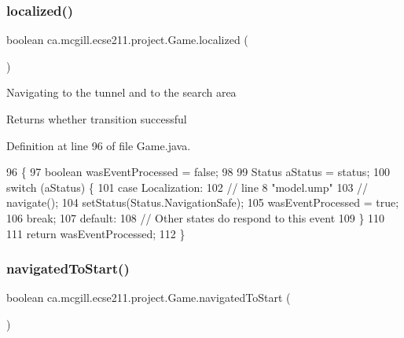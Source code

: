 \subsubsection{\texorpdfstring{localized()}{localized()}}
{\footnotesize\ttfamily boolean ca.\+mcgill.\+ecse211.\+project.\+Game.\+localized (\begin{DoxyParamCaption}{ }\end{DoxyParamCaption})}

Navigating to the tunnel and to the search area

\begin{DoxyReturn}{Returns}
whether transition successful 
\end{DoxyReturn}


Definition at line 96 of file Game.\+java.


\begin{DoxyCode}
96                              \{
97     \textcolor{keywordtype}{boolean} wasEventProcessed = \textcolor{keyword}{false};
98 
99     Status aStatus = status;
100     \textcolor{keywordflow}{switch} (aStatus) \{
101       \textcolor{keywordflow}{case} Localization:
102         \textcolor{comment}{// line 8 "model.ump"}
103         \textcolor{comment}{// navigate();}
104         setStatus(Status.NavigationSafe);
105         wasEventProcessed = \textcolor{keyword}{true};
106         \textcolor{keywordflow}{break};
107       \textcolor{keywordflow}{default}:
108         \textcolor{comment}{// Other states do respond to this event}
109     \}
110 
111     \textcolor{keywordflow}{return} wasEventProcessed;
112   \}
\end{DoxyCode}
\mbox{\label{enumca_1_1mcgill_1_1ecse211_1_1project_1_1_game_a5f387482790bf2c55413a6619b4d00d8}} 
\subsubsection{\texorpdfstring{navigated\+To\+Start()}{navigatedToStart()}}
{\footnotesize\ttfamily boolean ca.\+mcgill.\+ecse211.\+project.\+Game.\+navigated\+To\+Start (\begin{DoxyParamCaption}{ }\end{DoxyParamCaption})}


